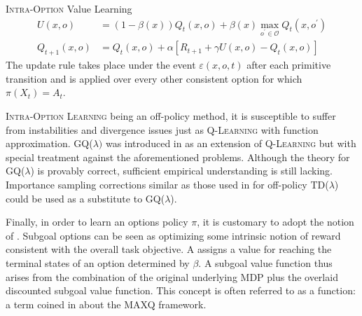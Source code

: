 \begin{defn}{\textsc{Intra-Option} Value Learning}
\begin{align}
U(x, o) &= (1 - \beta(x))Q_t(x, o) + \beta(x) \max_{o^\prime \in \mathcal{O}} Q_t(x, o^\prime) \\
Q_{t+1}(x, o) &= Q_t(x, o) + \alpha \left[ R_{t+1} + \gamma U(x, o) - Q_t(x, o) \right]
\label{eq:intra-option-learning}
\end{align}
The update rule takes place under the event $\varepsilon(x, o, t)$ after each primitive
transition and is applied over every other consistent option for which $\pi(X_t) = A_t$.
\end{defn}

\textsc{Intra-Option Learning} being an off-policy method, it is susceptible to suffer from instabilities and divergence issues just as \textsc{Q-Learning}
with function approximation. GQ($\lambda)$ was introduced in \cite{Maei2010} as an
extension of \textsc{Q-Learning} but with special treatment against the aforementioned
problems. Although the theory for GQ($\lambda$) is provably correct, sufficient empirical
understanding is still lacking. Importance sampling
corrections similar as those used in \cite{Precup2001} for off-policy TD($\lambda$)
could be used as a substitute to GQ($\lambda$).

Finally, in order to learn an options policy $\pi$, it is customary to adopt the notion of 
. Subgoal options can be seen as optimizing some intrinsic notion of reward
consistent with the overall task objective. A  assigns a
value for reaching the terminal states of an option determined by $\beta$. A subgoal
value function thus arises from the combination of the original underlying MDP plus the
overlaid discounted subgoal value function. This concept is often referred to as a 
 function: a term coined in \cite{Dietterich1999}
about the \textsc{MAXQ} framework.	

